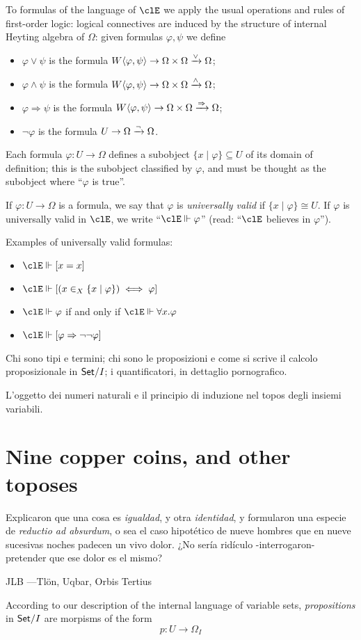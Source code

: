 \documentclass{amsart}
\def\la{\langle}
\def\ra{\rangle}
\def\lr#1#2{\la #1,#2\ra}
\begin{document}
To formulas of the language of $\clE$ we apply the usual operations and rules of first-order logic: logical connectives are induced by the structure of internal Heyting algebra of $\Omega$: given formulas $\varphi,\psi$ we define
\begin{itemize}
  \item $\varphi\lor \psi$ is the formula $W\lr{\varphi}{\psi} \to \Omega\times \Omega \xto{\lor} \Omega$;
  \item $\varphi\land\psi$ is the formula $W\lr{\varphi}{\psi} \to \Omega\times \Omega \xto{\land} \Omega$;
  \item $\varphi\Rightarrow\psi$ is the formula $W\lr{\varphi}{\psi} \to \Omega\times \Omega \xto{\Rightarrow} \Omega$;
  \item $\lnot\varphi$ is the formula $U \to \Omega \xrightarrow{\lnot} \Omega$.
\end{itemize}
Each formula $\varphi : U \to \Omega$ defines a subobject $\{x\mid \varphi\} \subseteq U$ of its domain of definition; this is the subobject classified by $\varphi$, and must be thought as the subobject where ``$\varphi$ is true''.

If $\varphi : U\to\Omega$ is a formula, we say that $\varphi$ is \emph{universally valid} if $\{x\mid\varphi\}\cong U$. If $\varphi$ is universally valid in $\clE$, we write ``$\clE\Vdash \varphi$'' (read: ``$\clE$ believes in $\varphi$'').

Examples of universally valid formulas:
\begin{itemize}
  \item $\clE\Vdash [x=x]$
  \item $\clE\Vdash [(x \in_X \{x\mid\varphi\}) \iff \varphi]$
  \item $\clE\Vdash \varphi$ if and only if $\clE \Vdash \forall x.\varphi$
  \item $\clE\Vdash [\varphi \Rightarrow \lnot\lnot\varphi]$
\end{itemize}
Chi sono tipi e termini; chi sono le proposizioni e come si scrive il calcolo proposizionale in $\mathsf{Set}/I$; i quantificatori, in dettaglio pornografico.

L'oggetto dei numeri naturali e il principio di induzione nel topos degli insiemi variabili.
\section{Nine copper coins, and other toposes}
\epigraph{Explicaron que una cosa es \emph{igualdad}, y otra \emph{identidad}, y formularon una especie de \emph{reductio ad absurdum}, o sea el caso hipotético de nueve hombres que en nueve sucesivas noches padecen un vivo dolor. ¿No sería ridículo -interrogaron- pretender que ese dolor es el mismo?}{JLB ---Tl\"on, Uqbar, Orbis Tertius}
According to our description of the internal language of variable sets, \emph{propositions} in $\mathsf{Set}/I$ are morpisms of the form
\[p : U \to \Omega_I\]
\end{document}
